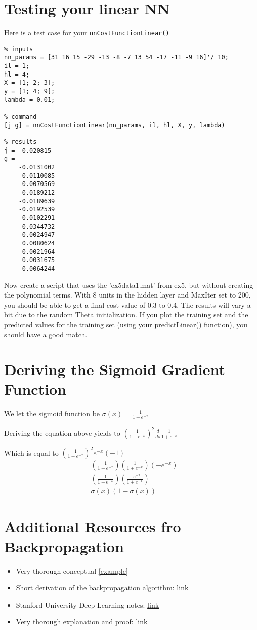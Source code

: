\section{Testing your linear NN}
Here is a test case for your \verb|nnCostFunctionLinear()|
\begin{verbatim}
% inputs
nn_params = [31 16 15 -29 -13 -8 -7 13 54 -17 -11 -9 16]'/ 10;
il = 1;
hl = 4;
X = [1; 2; 3];
y = [1; 4; 9];
lambda = 0.01;

% command
[j g] = nnCostFunctionLinear(nn_params, il, hl, X, y, lambda)

% results
j =  0.020815
g =
    -0.0131002
    -0.0110085
    -0.0070569
     0.0189212
    -0.0189639
    -0.0192539
    -0.0102291
     0.0344732
     0.0024947
     0.0080624
     0.0021964
     0.0031675
    -0.0064244
\end{verbatim}
Now create a script that uses the 'ex5data1.mat' from ex5, but without creating the polynomial terms. With 8 units in the hidden layer and MaxIter set to 200, you should be able to get a final cost value of 0.3 to 0.4. The results will vary a bit due to the random Theta initialization. If you plot the training set and the predicted values for the training set (using your predictLinear() function), you should have a good match.
\section{Deriving the Sigmoid Gradient Function}
We let the sigmoid function be $\sigma(x) = \frac{1}{1 + e^{-x}}$

Deriving the equation above yields to $(\frac{1}{1 + e^{-x}})^2 \frac {d}{ds} \frac{1}{1 + e^{-x}}$

Which is equal to $(\frac{1}{1 + e^{-x}})^2 e^{-x} (-1)$
\begin{align*}
&(\frac{1}{1 + e^{-x}}) (\frac{1}{1 + e^{-x}}) (-e^{-x})\\
&(\frac{1}{1 + e^{-x}}) (\frac{-e^{-x}}{1 + e^{-x}}) \\
&\sigma(x)(1- \sigma(x))
\end{align*}

\section{Additional Resources fro Backpropagation}
\begin{itemize}
\item Very thorough conceptual \href{https://web.archive.org/web/20150317210621/https://www4.rgu.ac.uk/files/chapter3%20-%20bp.pdf}{[example]}
\item Short derivation of the backpropagation algorithm: \href{http://pandamatak.com/people/anand/771/html/node37.html}{link}
\item Stanford University Deep Learning notes: \href{http://ufldl.stanford.edu/wiki/index.php/Backpropagation_Algorithm}{link}
\item Very thorough explanation and proof: \href{http://neuralnetworksanddeeplearning.com/chap2.html}{link}
\end{itemize}

